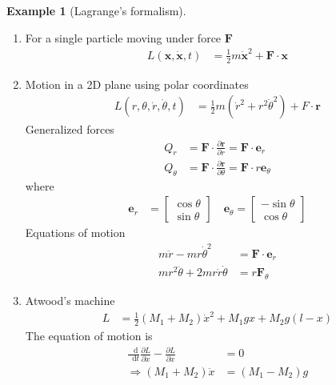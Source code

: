 \documentclass[twoside,11pt]{article}
\numberwithin{equation}{section} %
\newcommand{\lms}{\fontfamily{lmss}\selectfont} %
\renewcommand*\d{\mathop{}\!\mathrm{d}}
\theoremstyle{definition}
\newtheorem{example}{\lms Example}[section]
\theoremstyle{remark}
\begin{document}
\begin{example}[Lagrange's formalism]\
\begin{enumerate}[label=\arabic*)]
\item For a single particle moving under force $\mathbf{F}$
\begin{align*}
    L(\mathbf{x}, \dot{\mathbf{x}}, t) &= \frac{1}{2}m\dot{\mathbf{x}}^2 + \mathbf{F}\cdot\mathbf{x}
\end{align*}

\item Motion in a 2D plane using polar coordinates
\begin{align*}
    L(r, \theta, \dot{r}, \dot{\theta}, t) &= 
    \frac{1}{2}m(\dot{r}^2 + r^2\dot{\theta}^2)
    + F\cdot\mathbf{r}
\end{align*}
Generalized forces
\begin{align*}
    Q_r &= \mathbf{F}\cdot\frac{\partial\mathbf{r}}{\partial r}
    = \mathbf{F}\cdot\mathbf{e}_r\\
    Q_\theta &= \mathbf{F}\cdot\frac{\partial\mathbf{r}}{\partial\theta}
    = \mathbf{F}\cdot r\mathbf{e}_\theta
\end{align*}
where
\begin{align*}
    \mathbf{e}_r &= \begin{bmatrix}
        \cos\theta\\ \sin\theta
    \end{bmatrix}\quad
    \mathbf{e}_\theta = \begin{bmatrix}
        -\sin\theta\\ \cos\theta
    \end{bmatrix}
\end{align*}
Equations of motion
\begin{align*}
    m\ddot{r} - mr\dot{\theta}^2 &= \mathbf{F}\cdot\mathbf{e}_r\\
    mr^2\ddot{\theta} + 2mr\dot{r}\dot{\theta} &= r\mathbf{F}_\theta
\end{align*}

\item Atwood's machine
\begin{align*}
    L &= \frac{1}{2}(M_1+M_2)\dot{x}^2 + 
    M_1g x + M_2 g(l-x)
\end{align*}
The equation of motion is
\begin{align*}
    \frac{\d}{\d t}\frac{\partial L}{\partial \dot{x}}
    - \frac{\partial L}{\partial x} &= 0\\
    \Rightarrow (M_1 + M_2)\ddot{x} &= (M_1 - M_2)g
\end{align*}

\end{enumerate}
\end{example}
\end{document}
